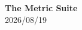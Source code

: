 \documentclass[11pt,a4paper,oneside]{report}
\begin{document}
\thispagestyle{empty}

\vspace*{2.2cm}
\begin{center}
  {\LARGE\bfseries The  Metric Suite}\\[22pt]
  {\small 2026/08/19}
\end{center}

\vfill
\clearpage

\tableofcontents
\clearpage
{}

\setcounter{chapter}{-1}

\end{document}

